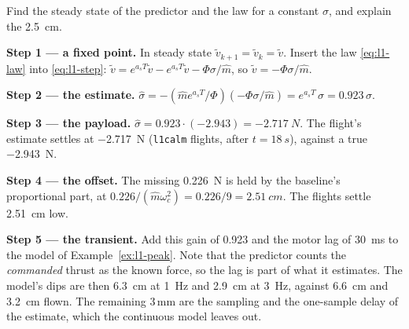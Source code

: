 
\begin{example}
\label{ex:l1-bias}
Find the steady state of the predictor and the law for a constant $\sigma$, and explain the \SI{2.5}{cm}.

\textbf{Step 1 — a fixed point.} In steady state $\tilde v_{k+1} = \tilde v_k = \tilde v$. Insert the law \cref{eq:l1-law} into \cref{eq:l1-step}: $\tilde v = e^{a_sT}\tilde v - e^{a_sT}\tilde v - \Phi\sigma/\hat m$, so $\tilde v = -\Phi\sigma/\hat m$.

\textbf{Step 2 — the estimate.} $\hat\sigma = -(\hat m e^{a_sT}/\Phi)(-\Phi\sigma/\hat m) = e^{a_sT}\,\sigma = 0.923\,\sigma$.

\textbf{Step 3 — the payload.} $\hat\sigma = 0.923 \cdot (-2.943) = \SI{-2.717}{N}$. The flight's estimate settles at \SI{-2.717}{N} (\texttt{l1calm} flights, after $t = \SI{18}{s}$), against a true \SI{-2.943}{N}.

\textbf{Step 4 — the offset.} The missing \SI{0.226}{N} is held by the baseline's proportional part, at $0.226/(\hat m\omega_c^2) = 0.226/9 = \SI{2.51}{cm}$. The flights settle \SI{2.51}{cm} low.

\textbf{Step 5 — the transient.} Add this gain of 0.923 and the motor lag of \SI{30}{ms} to the model of Example~\ref{ex:l1-peak}. Note that the predictor counts the \emph{commanded} thrust as the known force, so the lag is part of what it estimates. The model's dips are then \SI{6.3}{cm} at \SI{1}{Hz} and \SI{2.9}{cm} at \SI{3}{Hz}, against \SI{6.6}{cm} and \SI{3.2}{cm} flown. The remaining 3\,mm are the sampling and the one-sample delay of the estimate, which the continuous model leaves out.
\end{example}

